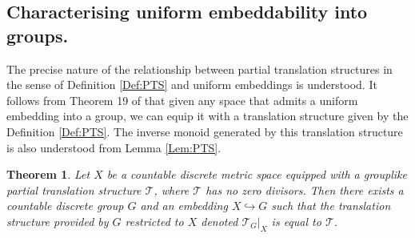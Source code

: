 \documentclass[11pt]{amsart}
\theoremstyle{plain}
\newtheorem{theorem}{Theorem}%
\theoremstyle{definition}%
\theoremstyle{remark}%
\begin{document}
\subsection{Characterising uniform embeddability into groups.}
The precise nature of the relationship between partial translation structures in the sense of Definition \ref{Def:PTS} and uniform embeddings is understood. It follows from Theorem 19 of \cite{MR2363428} that given any space that admits a uniform embedding into a group, we can equip it with a translation structure given by the Definition \ref{Def:PTS}. The inverse monoid generated by this translation structure is also understood from Lemma \ref{Lem:PTS}.

\begin{theorem}\label{thm:T2}
Let $X$ be a countable discrete metric space equipped with a grouplike partial translation structure $\mathcal{T}$, where $\mathcal{T}$ has no zero divisors. Then there exists a countable discrete group $G$ and an embedding $X \hookrightarrow G$ such that the translation structure provided by $G$ restricted to $X$ denoted $\mathcal{T}_{G}|_{X}$ is equal to $\mathcal{T}$.
\end{theorem}
\end{document}
